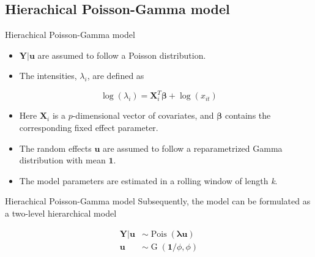 \documentclass[aspectratio=169]{beamer}
\DeclareMathOperator{\G}{G}
\DeclareMathOperator{\Pois}{Pois}
\begin{document}
\hypertarget{hierachical-poisson-gamma-model}{%
\subsection{Hierachical Poisson-Gamma
model}\label{hierachical-poisson-gamma-model}}

\begin{frame}{Hierachical Poisson-Gamma model}
\begin{itemize}
  \item $\boldsymbol{Y|u}$ are assumed to follow a Poisson distribution. 
  \item The intensities, $\lambda_{i}$, are defined as
\end{itemize}

\begin{equation}
  \log(\lambda_{i})=\boldsymbol{X}_{i}^{T}\boldsymbol{\beta}+\log(x_{it})
\end{equation}

\begin{itemize}
  \item Here $\boldsymbol{X}_{i}$ is a $p$-dimensional vector of covariates, and $\boldsymbol{\beta}$ contains the corresponding fixed effect parameter.
  \item The random effects $\boldsymbol{u}$ are assumed to follow a reparametrized Gamma distribution with mean $\boldsymbol{1}$.
  \item The model parameters are estimated in a rolling window of length \textit{k}.
\end{itemize}
\end{frame}

\begin{frame}{Hierachical Poisson-Gamma model}
\protect\hypertarget{hierachical-poisson-gamma-model-1}{}
Subsequently, the model can be formulated as a two-level hierarchical
model

\begin{subequations} \label{eq:PoisGam}
  \begin{alignat}{2}
    \boldsymbol{Y|u} &\sim \Pois (\boldsymbol{\lambda} \boldsymbol{u}) \label{eq:pois_g0} \\ 
    \boldsymbol{u} &\sim \G(\boldsymbol{1}/\phi,\phi) \label{eq:pois_g1}
  \end{alignat}
\end{subequations}
\end{frame}
\end{document}

